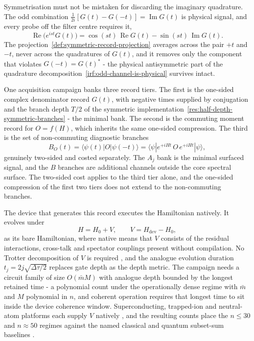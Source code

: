 Symmetrisation must not be mistaken for discarding the imaginary quadrature. The odd combination $\frac{1}{2i}[G(t) - G(-t)] = \operatorname{Im} G(t)$ is physical signal, and every probe off the filter centre requires it,
\begin{equation}\label{irf:odd-channel-is-physical}
\operatorname{Re}\big(e^{ist}G(t)\big) = \cos(st)\,\operatorname{Re} G(t) - \sin(st)\,\operatorname{Im} G(t) .
\end{equation}
The projection~\eqref{def:symmetric-record-projection} averages across the pair $+t$ and $-t$, never across the quadratures of $G(t)$, and it removes only the component that violates $G(-t) = G(t)^*$ - the physical antisymmetric part of the quadrature decomposition~\eqref{irf:odd-channel-is-physical} survives intact.

One acquisition campaign banks three record tiers. The first is the one-sided complex denominator record $G(t)$, with negative times supplied by conjugation and the branch depth $T/2$ of the symmetric implementation~\eqref{res:half-depth-symmetric-branches} - the minimal bank. The second is the commuting moment record for $O = f(H)$, which inherits the same one-sided compression. The third is the set of non-commuting diagnostic branches
\begin{equation}\label{def:record-architecture-three-tier}
B_O(t) = \langle\psi(t)|O|\psi(-t)\rangle = \langle\psi|e^{+iHt}\,O\,e^{+iHt}|\psi\rangle ,
\end{equation}
genuinely two-sided and costed separately. The $A_j$ bank is the minimal surfaced signal, and the $B$ branches are additional channels outside the core spectral surface. The two-sided cost applies to the third tier alone, and the one-sided compression of the first two tiers does not extend to the non-commuting branches.

The device that generates this record executes the Hamiltonian natively. It evolves under
\[
H = H_0 + V, \qquad V = H_{\mathrm{dev}} - H_0 ,
\]
as its bare Hamiltonian, where native means that $V$ consists of the residual interactions, cross-talk and spectator couplings present without compilation. No Trotter decomposition of $V$ is required \cite{lloyd1996universal}, and the analogue evolution duration $t_j = 2j\sqrt{\Delta\tau/2}$ replaces gate depth as the depth metric. The campaign needs a circuit family of size $O(\bar m M)$ with analogue depth bounded by the longest retained time - a polynomial count under the operationally dense regime with $\bar m$ and $M$ polynomial in $n$, and coherent operation requires that longest time to sit inside the device coherence window. Superconducting, trapped-ion and neutral-atom platforms each supply $V$ natively \cite{yan2018tunable, kamakari2022digital}, and the resulting counts place the $n \le 30$ and $n \approx 50$ regimes against the named classical and quantum subset-sum baselines \cite{hgj2010, bonnetain2020improved}.

